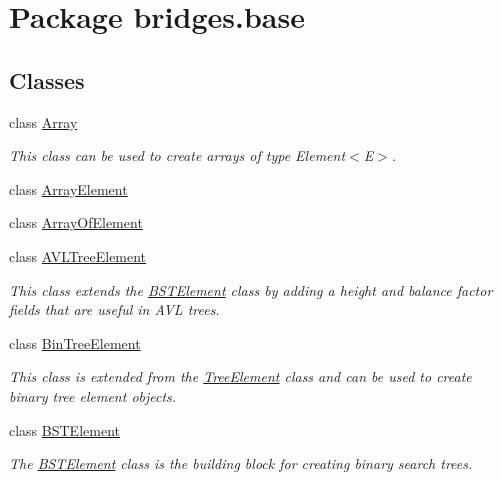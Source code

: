\hypertarget{namespacebridges_1_1base}{}\section{Package bridges.\+base}
\label{namespacebridges_1_1base}
\subsection*{Classes}
\begin{DoxyCompactItemize}
\item 
class \mbox{\hyperlink{classbridges_1_1base_1_1_array}{Array}}
\begin{DoxyCompactList}\small\item\em This class can be used to create arrays of type Element$<$\+E$>$. \end{DoxyCompactList}\item 
class \mbox{\hyperlink{classbridges_1_1base_1_1_array_element}{Array\+Element}}
\item 
class \mbox{\hyperlink{classbridges_1_1base_1_1_array_of_element}{Array\+Of\+Element}}
\item 
class \mbox{\hyperlink{classbridges_1_1base_1_1_a_v_l_tree_element}{A\+V\+L\+Tree\+Element}}
\begin{DoxyCompactList}\small\item\em This class extends the \mbox{\hyperlink{classbridges_1_1base_1_1_b_s_t_element}{B\+S\+T\+Element}} class by adding a height and balance factor fields that are useful in A\+VL trees. \end{DoxyCompactList}\item 
class \mbox{\hyperlink{classbridges_1_1base_1_1_bin_tree_element}{Bin\+Tree\+Element}}
\begin{DoxyCompactList}\small\item\em This class is extended from the \mbox{\hyperlink{classbridges_1_1base_1_1_tree_element}{Tree\+Element}} class and can be used to create binary tree element objects. \end{DoxyCompactList}\item 
class \mbox{\hyperlink{classbridges_1_1base_1_1_b_s_t_element}{B\+S\+T\+Element}}
\begin{DoxyCompactList}\small\item\em The \mbox{\hyperlink{classbridges_1_1base_1_1_b_s_t_element}{B\+S\+T\+Element}} class is the building block for creating binary search trees. \end{DoxyCompactList}\item 

\end{DoxyCompactItemize}
